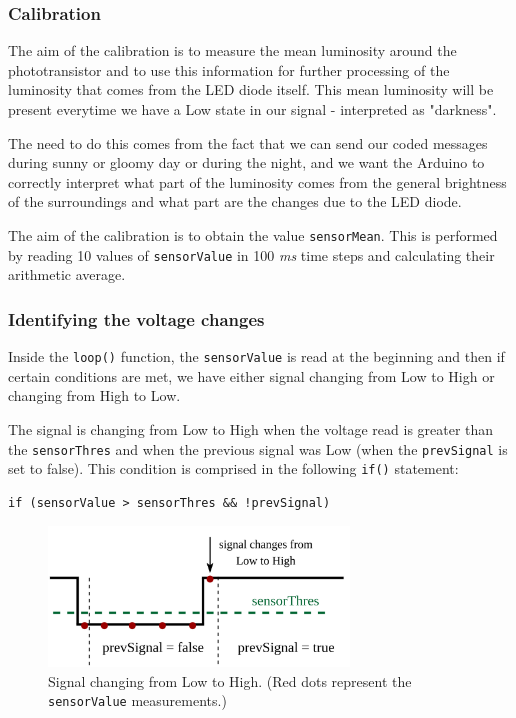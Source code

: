 \documentclass[10pt]{report}
\begin{document}
\subsubsection{Calibration}

The aim of the calibration is to measure the mean luminosity around the phototransistor and to use this information for further processing of the luminosity that comes from the LED diode itself. This mean luminosity will be present everytime we have a Low state in our signal - interpreted as "darkness".

The need to do this comes from the fact that we can send our coded messages during sunny or gloomy day or during the night, and we want the Arduino to correctly interpret what part of the luminosity comes from the general brightness of the surroundings and what part are the changes due to the LED diode.

The aim of the calibration is to obtain the value \verb|sensorMean|. This is performed by reading 10 values of \verb|sensorValue| in 100 \textit{ms} time steps and calculating their arithmetic average.

\subsubsection{Identifying the voltage changes}

Inside the \verb|loop()| function, the \verb|sensorValue| is read at the beginning and then if certain conditions are met, we have either signal changing from Low to High or changing from High to Low.

The signal is changing from Low to High when the voltage read is greater than the \verb|sensorThres| and when the previous signal was Low (when the \verb|prevSignal| is set to false). This condition is comprised in the following \verb|if()| statement:

\begin{lstlisting}
if (sensorValue > sensorThres && !prevSignal)
\end{lstlisting}

\begin{figure}[H]
\centering\includegraphics[width=8cm]{lowtohigh}
\caption{Signal changing from Low to High. (Red dots represent the \texttt{sensorValue} measurements.)}				
\label{fig:arduino_code}
\end{figure}
\end{document}
